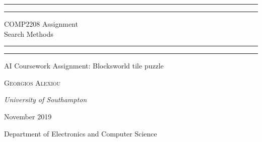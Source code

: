 \documentclass[a4paper, 11pt]{article} %
\begin{document}
\begin{titlepage} %

	\centering %
	
	\scshape %
	
	\vspace*{\baselineskip} %
	
	
	\rule{\textwidth}{1.6pt}\vspace*{-\baselineskip}\vspace*{2pt} %
	\rule{\textwidth}{0.4pt} %
	
	\vspace{0.75\baselineskip} %
	
	{\LARGE COMP2208 Assignment} %
	\vspace{5 mm}\\
	{\LARGE Search Methods}
	
	\vspace{0.75\baselineskip} %
	
	\rule{\textwidth}{0.4pt}\vspace*{-\baselineskip}\vspace{3.2pt} %
	\rule{\textwidth}{1.6pt} %
	
	\vspace{2\baselineskip} %

	
	AI Coursework Assignment: Blocksworld tile puzzle %
	
	\vspace*{3\baselineskip} %
	
	\vspace{0.5\baselineskip} %
	
	{\scshape\Large Georgios Alexiou} %
	
	\vspace{0.5\baselineskip} %
	
	\textit{University of Southampton} %
	
	\vfill %
	
	\vspace{0.3\baselineskip} %
	
	November 2019 %
	
	{\large Department of Electronics and Computer Science} %

\end{titlepage}
\end{document}
